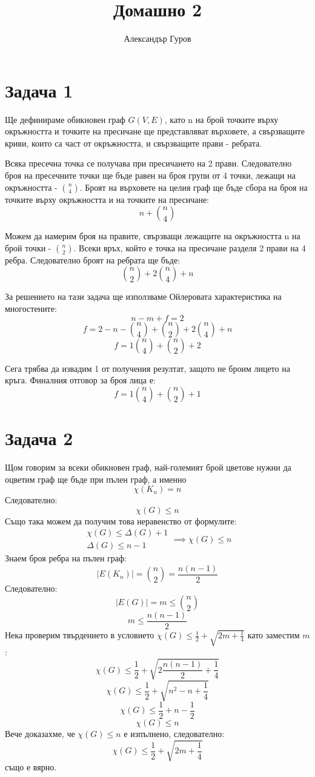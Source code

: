 \documentclass{article}
\title{Домашно 2}
\author{Александър Гуров}
\date{\datebulgarian{\today}}
\begin{document}
\maketitle
\section*{Задача 1}

Ще дефинираме обикновен граф $G(V,E)$, като n на брой точките върху окръжността и точките
на пресичане ще представляват върховете, а свързващите криви,
които са част от окръжността, и свързващите прави - ребрата.



Всяка пресечна точка се получава при пресичането на 2 прави. Следователно броя на пресечните точки
ще бъде равен на броя групи от 4 точки, лежащи на окръжността - $\binom{n}{4}$.
Броят на върховете на целия граф ще бъде сбора на броя на точките върху окръжността и на точките
на пресичане:
\[
    n+\binom{n}{4}
\]

Можем да намерим броя на правите, свързващи лежащите на окръжността n на брой точки - $\binom{n}{2}$.
Всеки връх, който е точка на пресичане разделя 2 прави на 4 ребра. Следователно броят
на ребрата ще бъде:
\[
    \binom{n}{2}+2\binom{n}{4}+n
\]

За решението на тази задача ще използваме Ойлеровата характеристика на многостените:
\[
    n-m+f=2
\]
\[
    f=2-n-\binom{n}{4}+\binom{n}{2}+2\binom{n}{4}+n
\]
\[
    f=1\binom{n}{4}+\binom{n}{2}+2
\]

Сега трябва да извадим 1 от получения резултат, защото не броим лицето на кръга.
Финалния отговор за броя лица е:
\[
    f=1\binom{n}{4}+\binom{n}{2}+1
\]

\section*{Задача 2}
Щом говорим за всеки обикновен граф, най-големият брой цветове нужни да оцветим граф ще бъде при пълен граф, а именно
\[
    \chi(K_n)=n
\]
Следователно:
\[
    \chi(G)\leq n
\]
Също така можем да получим това неравенство от формулите:
\[
    \begin{array}{c}
        \chi (G) \leq \Delta (G)+1 \\
        \Delta(G) \leq n-1
    \end{array}
    \implies
    \chi(G)\leq n
\]
Знаем броя ребра на пълен граф:
\[
    |E(K_n)|=\binom{n}{2}=\frac{n(n-1)}{2}
\]
Следователно:
\[
    |E(G)|=m\leq \binom{n}{2}
\]
\[
    m\leq \frac{n(n-1)}{2}
\]
Нека проверим твърдението в условието $\chi (G)\leq \frac{1}{2} + \sqrt{2m+\frac{1}{4}}$ като заместим $m$:
\[
    \chi (G)\leq \frac{1}{2} + \sqrt{2\frac{n(n-1)}{2}+\frac{1}{4}}
\]
\[
    \chi (G)\leq \frac{1}{2} + \sqrt{n^2-n+\frac{1}{4}}
\]
\[
    \chi (G)\leq \frac{1}{2} + n-\frac{1}{2}
\]
\[
    \chi (G)\leq n
\]
Вече доказахме, че $\chi (G)\leq n$ е изпълнено, следователно:
\[
    \chi (G)\leq \frac{1}{2} + \sqrt{2m+\frac{1}{4}}
\]
също е вярно.
\end{document}
